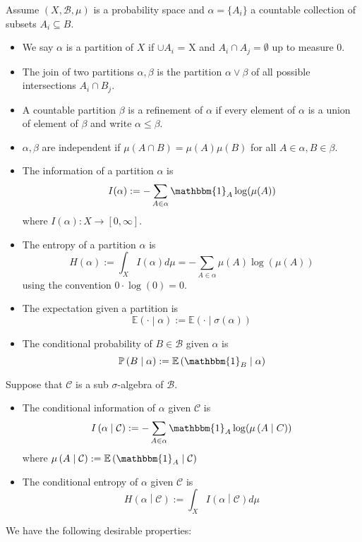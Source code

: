\documentclass[11pt]{article}
\newcommand{\defeq}{:=}
\newcommand{\msrspc}{\ensuremath{(X,\mathcal{B},\mu)}}
\newcommand{\indic}[1]{\mathbbm{1}_{#1}}
\newcommand{\relmiddle}[1]{\mathrel{}\middle#1\mathrel{}}
\newcommand{\rmv}{\relmiddle|}
\newcommand{\gvn}[2]{\ensuremath{\left(#1\rmv#2\right)}}
\newcommand{\expg}[2]{\ensuremath{\mathbb{E}\gvn{#1}{#2}}}
\newcommand{\infog}[2]{\ensuremath{I\gvn{#1}{#2}}}
\newcommand{\entrg}[2]{\ensuremath{H\gvn{#1}{#2}}}
\newcommand{\probg}[2]{\ensuremath{\mathbb{P}\gvn{#1}{#2}}}
\newenvironment{defin}
	{\begin{mdframed}[backgroundcolor=white, roundcorner=5pt, linewidth=1pt]}
	{\end{mdframed}}
\newcommand{\mdf}[1]{{\color{red} #1}}
\begin{document}
\begin{defin}
Assume $\msrspc$ is a probability space and $\alpha=\{A_i\}$ a countable collection of subsets $A_i\subseteq B$.
\begin{itemize}
	\item We say $\alpha$ is a \mdf{partition} of $X$ if $\cup A_i$ = X and $A_i\cap A_j=\emptyset$ up to measure 0.
	\item The \mdf{join} of two partitions $\alpha,\beta$ is the partition $\alpha\vee\beta$ of all possible intersections $A_i\cap B_j$.
	\item A countable partition $\beta$ is a \mdf{refinement} of $\alpha$ if every element of $\alpha$ is a union of element of $\beta$ and write $\alpha\leq\beta$.
	\item $\alpha,\beta$ are \mdf{independent} if $\mu(A\cap B)=\mu(A)\mu(B)$ for all $A\in\alpha, B\in\beta$.
	\item The \mdf{information of a partition} $\alpha$ is
		$$I(\alpha)\defeq-\sum_{A\in\alpha}\indic{A}\log(\mu(A))$$
		where $I(\alpha):X\to[0,\infty]$.
	\item The \mdf{entropy of a partition} $\alpha$ is
		$$H(\alpha)\defeq\int_X I(\alpha)d\mu=-\sum_{A\in\alpha}\mu(A)\log(\mu(A))$$
		using the convention $0\cdot\log(0)=0$.
	\item The \mdf{expectation given a partition} is
		$$\expg{\cdot}{\alpha}\defeq\expg{\cdot}{\sigma(\alpha)}$$
	\item The \mdf{conditional probability} of $B\in\mathcal{B}$ given $\alpha$ is
		$$\probg{B}{\alpha}\defeq\expg{\indic{B}}{\alpha}$$
\end{itemize}
Suppose that $\mathcal{C}$ is a sub $\sigma$-algebra of $\mathcal{B}$.
\begin{itemize}
	\item The \mdf{conditional information of $\alpha$ given $\mathcal{C}$} is
		$$\infog{\alpha}{\mathcal{C}}\defeq - \sum_{A\in\alpha}\indic{A}\log(\mu\gvn{A}{C})$$
	where $\mu\gvn{A}{\mathcal{C}}\defeq\expg{\indic{A}}{\mathcal{C}}$
	\item The \mdf{conditional entropy of $\alpha$ given $\mathcal{C}$} is
			$$\entrg{\alpha}{\mathcal{C}}\defeq\int_X\infog{\alpha}{\mathcal{C}}d\mu$$	
\end{itemize}
\end{defin}
We have the following desirable properties:
\end{document}
